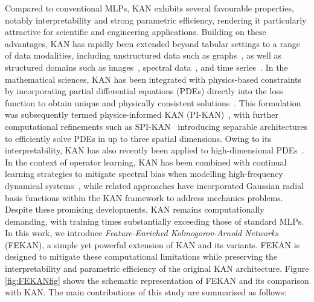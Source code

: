 \documentclass{article}
\begin{document}
Compared to conventional MLPs, KAN exhibits several favourable properties, notably interpretability and strong parametric efficiency, rendering it particularly attractive for scientific and engineering applications. Building on these advantages, KAN has rapidly been extended beyond tabular settings to a range of data modalities, including unstructured data such as graphs~\cite{kiamari2024gkan,de2024kolmogorov}, as well as structured domains such as images~\cite{abd2024ckan}, spectral data~\cite{jamali2024learn}, and time series~\cite{vaca2024kolmogorov}. In the mathematical sciences, KAN has been integrated with physics-based constraints by incorporating partial differential equations (PDEs) directly into the loss function to obtain unique and physically consistent solutions~\cite{liu2024kan}. This formulation was subsequently termed physics-informed KAN (PI-KAN)~\cite{wang2025kolmogorov,zhao2025pikan,guo2025physics,shukla2024comprehensive}, with further computational refinements such as SPI-KAN~\cite{jacob2025spikans} introducing separable architectures to efficiently solve PDEs in up to three spatial dimensions. Owing to its interpretability, KAN has also recently been applied to high-dimensional PDEs~\cite{menon2025anant}. In the context of operator learning, KAN has been combined with continual learning strategies to mitigate spectral bias when modelling high-frequency dynamical systems~\cite{Zhang2025BubbleOKAN}, while related approaches have incorporated Gaussian radial basis functions within the KAN framework to address mechanics problems. Despite these promising developments, KAN remains computationally demanding, with training times substantially exceeding those of standard MLPs. In this work, we introduce \textit{Feature-Enriched Kolmogorov-Arnold Networks} (FEKAN), a simple yet powerful extension of KAN and its variants. FEKAN is designed to mitigate these computational limitations while preserving the interpretability and parametric efficiency of the original KAN architecture. Figure \ref{fig:FEKANfig} shows the schematic representation of FEKAN and its comparison with KAN. The main contributions of this study are summarised as follows:
\end{document}
